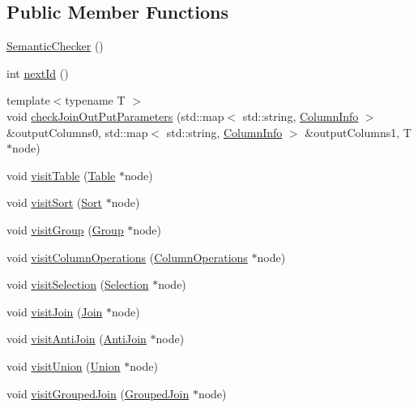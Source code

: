 \subsection*{Public Member Functions}
\begin{DoxyCompactItemize}
\item 
\hyperlink{class_semantic_checker_a35a20bf073bd1fdf1de937db47b9f4c0}{Semantic\+Checker} ()
\item 
int \hyperlink{class_semantic_checker_a7bfc82245e0af345db051ab8faea502e}{next\+Id} ()
\item 
{\footnotesize template$<$typename T $>$ }\\void \hyperlink{class_semantic_checker_a31d420801c78aaf317a4b0094f9da3df}{check\+Join\+Out\+Put\+Parameters} (std\+::map$<$ std\+::string, \hyperlink{class_column_info}{Column\+Info} $>$ \&output\+Columns0, std\+::map$<$ std\+::string, \hyperlink{class_column_info}{Column\+Info} $>$ \&output\+Columns1, T $\ast$node)
\item 
void \hyperlink{class_semantic_checker_a915d3f58ab60a0e6ba6f248e3c81f0c5}{visit\+Table} (\hyperlink{class_table}{Table} $\ast$node)
\item 
void \hyperlink{class_semantic_checker_ae7cbd8a1c92f544a282de4b741d1e19e}{visit\+Sort} (\hyperlink{class_sort}{Sort} $\ast$node)
\item 
void \hyperlink{class_semantic_checker_a8dfc703b185f05a0f57749e1eb3c0a56}{visit\+Group} (\hyperlink{class_group}{Group} $\ast$node)
\item 
void \hyperlink{class_semantic_checker_a5bd2ca32010822a95a6ef0a78190fc91}{visit\+Column\+Operations} (\hyperlink{class_column_operations}{Column\+Operations} $\ast$node)
\item 
void \hyperlink{class_semantic_checker_ac2825bf63bbda696b461166f915bacfe}{visit\+Selection} (\hyperlink{class_selection}{Selection} $\ast$node)
\item 
void \hyperlink{class_semantic_checker_a047de398ed6fab98a4ec6c1db533a66e}{visit\+Join} (\hyperlink{class_join}{Join} $\ast$node)
\item 
void \hyperlink{class_semantic_checker_aed141e3f22e681c74355fb3b84deb2d4}{visit\+Anti\+Join} (\hyperlink{class_anti_join}{Anti\+Join} $\ast$node)
\item 
void \hyperlink{class_semantic_checker_a120a86891155bd0296b9f3e878462bc6}{visit\+Union} (\hyperlink{class_union}{Union} $\ast$node)
\item 
void \hyperlink{class_semantic_checker_a44c4c5cf8cde9785a2a11f446d8fb90a}{visit\+Grouped\+Join} (\hyperlink{class_grouped_join}{Grouped\+Join} $\ast$node)
\end{DoxyCompactItemize}
